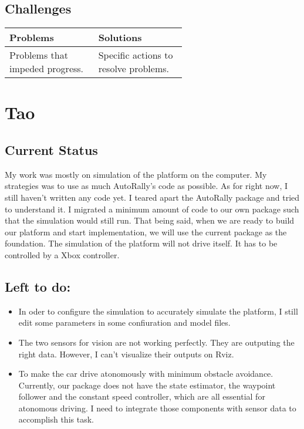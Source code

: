 \documentclass[compsoc,draftclsnofoot,onecolumn,10pt]{IEEEtran}
\begin{document}
	\subsection{Challenges}
		
		\begin{tabular}{|p{0.3\linewidth}|p{0.3\linewidth}|}
			\hline
			\textbf{Problems} & \textbf{Solutions}\\
			\hline
			Problems that impeded progress. & Specific actions to resolve problems.\\
			\hline
						
		\end{tabular}
		
\section{Tao}
\subsection{Current Status}
My work was mostly on simulation of the platform on the computer. My strategies was to use as much AutoRally's code as possible. As for right now, I still haven't written any code yet. I teared apart the AutoRally package and tried to understand it. I migrated a minimum amount of code to our own package such that the simulation would still run. That being said, when we are ready to build our platform and start implementation, we will use the current package as the foundation. The simulation of the platform will not drive itself. It has to be controlled by a Xbox controller. 

\subsection{Left to do:}
\begin{itemize}
	\item In oder to configure the simulation to accurately simulate the platform, I still edit some parameters in some confiuration and model files. 
	\item The two sensors for vision are not working perfectly. They are outputing the right data. However, I can't visualize their outputs on Rviz.
	\item To make the car drive atonomously with minimum obstacle avoidance. Currently, our package does not have the state estimator, the waypoint follower and the constant speed controller, which are all essential for atonomous driving. I need to integrate those components with sensor data to accomplish this task.
\end{itemize}
\end{document}
